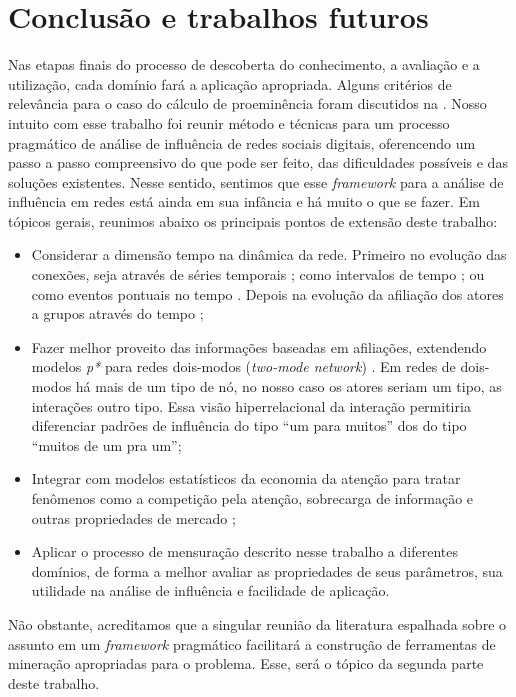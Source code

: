 \chapter{Conclusão e trabalhos futuros}
\label{ch:conclusao}

Nas etapas finais do processo de descoberta do conhecimento, a avaliação e a
utilização, cada domínio fará a aplicação apropriada. Alguns critérios de
relevância para o caso do cálculo de proeminência foram discutidos na
. Nosso intuito com esse trabalho foi reunir método e
técnicas para um processo pragmático de análise de influência de redes sociais
digitais, oferencendo um passo a passo compreensivo do que pode ser feito, das
dificuldades possíveis e das soluções existentes. Nesse sentido, sentimos que
esse \emph{framework} para a análise de influência em redes está ainda em sua
infância e há muito o que se fazer. Em tópicos gerais, reunimos abaixo os
principais pontos de extensão deste trabalho:

\begin{itemize}
  \item Considerar a dimensão tempo na dinâmica da rede. Primeiro no
  evolução das conexões, seja através de séries temporais \citep{Snijders1996};
  como intervalos de tempo \citep{Butts2004}; ou como eventos pontuais no tempo
  \citep{Butts2008a}. Depois na evolução da afiliação dos atores a grupos
  através do tempo \citep{Berger-Wolf2006};
  \item Fazer melhor proveito das informações baseadas em afiliações, extendendo
  modelos \emph{p*} para redes dois-modos (\emph{two-mode network})
  \citep{Field2006}. Em redes de dois-modos há mais de um tipo de nó, no nosso
  caso os atores seriam um tipo, as interações outro tipo. Essa visão
  hiperrelacional da interação permitiria diferenciar padrões de influência do
  tipo ``um para muitos'' dos do tipo ``muitos de um pra um'';
  \item Integrar com modelos estatísticos da economia da atenção para tratar
  fenômenos como a competição pela atenção, sobrecarga de informação e outras
  propriedades de mercado \citep{Falkinger2007}; 
  \item Aplicar o processo de mensuração descrito nesse trabalho a diferentes
  domínios, de forma a melhor avaliar as propriedades de seus parâmetros, sua
  utilidade na análise de influência e facilidade de aplicação.
\end{itemize}

Não obstante, acreditamos que a singular reunião da literatura espalhada sobre
o assunto em um \emph{framework} pragmático facilitará a construção de
ferramentas de mineração apropriadas para o problema. Esse, será o tópico da
segunda parte deste trabalho.